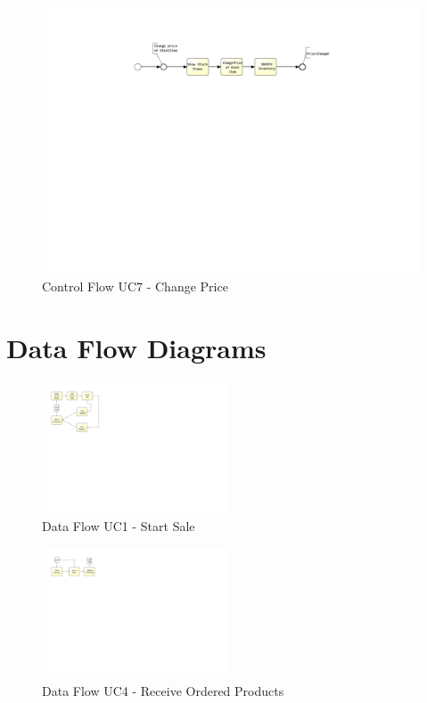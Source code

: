 \begin{figure}[h!]
	\centering
	\includegraphics[width=\textwidth, trim={6cm 15.5cm 7cm 1cm}]{img/UC7Control.pdf}
	\caption{Control Flow UC7 - Change Price }
	\label{fig:UC7Control}
\end{figure}


\pagebreak












\section{Data Flow Diagrams}
\label{sec:appendix:DataFlow}

\begin{figure}[h!]
	\centering
	\includegraphics[width=5.5cm, trim={3cm 13cm 22cm 1cm}]{img/UC1DFD.pdf}
	\caption{Data Flow UC1 - Start Sale}
	\label{fig:UC1DFD}
\end{figure}


\begin{figure}[h!]
	\centering
	\includegraphics[width=5.5cm, trim={3cm 16cm 22cm 1cm}]{img/UC4DFD.pdf}
	\caption{Data Flow UC4 - Receive Ordered Products }
	\label{fig:UC4DFD}
\end{figure}

